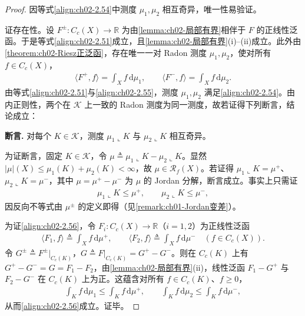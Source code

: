 \documentclass[../../main.tex]{subfiles}%
\begin{document}
\begin{proof}
因等式\eqref{align:ch02-2.54}中测度 $\mu_1,\mu_2$ 相互奇异，唯一性易验证。

证存在性。设 $F^\pm:C_c(X)\to\mathbb R$ 为由\cref{lemma:ch02-局部有界}相伴于 $F$ 的正线性泛函。于是等式\eqref{align:ch02-2.51}成立，且\cref{lemma:ch02-局部有界}(i)--(ii)成立。此外由\cref{theorem:ch02-Riesz正泛函}，存在唯一一对 Radon 测度 $\mu_1,\mu_2$，使对所有 $f\in C_c(X)$，
\begin{align}
\langle F^+,f\rangle=\int_X f\,\mathrm{d}\mu_1,\qquad
\langle F^-,f\rangle=\int_X f\,\mathrm{d}\mu_2. \label{align:ch02-2.55}
\end{align}
由等式\eqref{align:ch02-2.51}与\eqref{align:ch02-2.55}，测度 $\mu_1,\mu_2$ 满足\eqref{align:ch02-2.54}。由内正则性，两个在 $\mathscr K$ 上一致的 Radon 测度为同一测度，故若证得下列断言，结论成立：

\textbf{断言.} 对每个 $K\in\mathscr K$，测度 $\mu_1\llcorner K$ 与 $\mu_2\llcorner K$ 相互奇异。

为证断言，固定 $K\in\mathscr K$，令 $\mu\triangleq \mu_1\llcorner K-\mu_2\llcorner K$。显然 $|\mu|(X)\leqslant\mu_1(K)+\mu_2(K)<\infty$，故 $\mu\in\mathscr R_f(X)$。若证得 $\mu_1\llcorner K=\mu^+$、$\mu_2\llcorner K=\mu^-$，其中 $\mu=\mu^+-\mu^-$ 为 $\mu$ 的 Jordan 分解，断言成立。事实上只需证
\begin{align}
\mu_1\llcorner K\leqslant\mu^+,\qquad\mu_2\llcorner K\leqslant\mu^-, \label{align:ch02-2.56}
\end{align}
因反向不等式由 $\mu^\pm$ 的定义即得（见\cref{remark:ch01-Jordan变差}）。

为证\eqref{align:ch02-2.56}，令 $F_i:C_c(X)\to\mathbb R$（$i=1,2$）为正线性泛函
\begin{align*}
\langle F_1,f\rangle\triangleq \int_X f\,\mathrm{d}\mu^+,\qquad
\langle F_2,f\rangle\triangleq \int_X f\,\mathrm{d}\mu^-\quad(f\in C_c(X)).
\end{align*}
令 $G^\pm\triangleq F^\pm|_{C_c(K)}$，$G\triangleq F|_{C_c(K)}=G^+-G^-$。则在 $C_c(K)$ 上有 $G^+-G^-=G=F_1-F_2$，由\cref{lemma:ch02-局部有界}(ii)，线性泛函 $F_1-G^+$ 与 $F_2-G^-$ 在 $C_c(K)$ 上为正。这蕴含对所有 $f\in C_c(K)$、$f\geqslant0$，
\begin{align*}
\int_K f\,\mathrm{d}\mu_1\leqslant\int_K f\,\mathrm{d}\mu^+,\qquad
\int_K f\,\mathrm{d}\mu_2\leqslant\int_K f\,\mathrm{d}\mu^-,
\end{align*}
从而\eqref{align:ch02-2.56}成立。证毕。
\end{proof}
\end{document}
